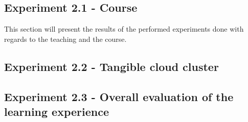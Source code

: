 
\subsection*{Experiment 2.1 - Course}
This section will present the results of the performed experiments done with regards to the teaching and the course.






 


\subsection*{Experiment 2.2 - Tangible cloud cluster}



\subsection*{Experiment 2.3 - Overall evaluation of the learning experience}
